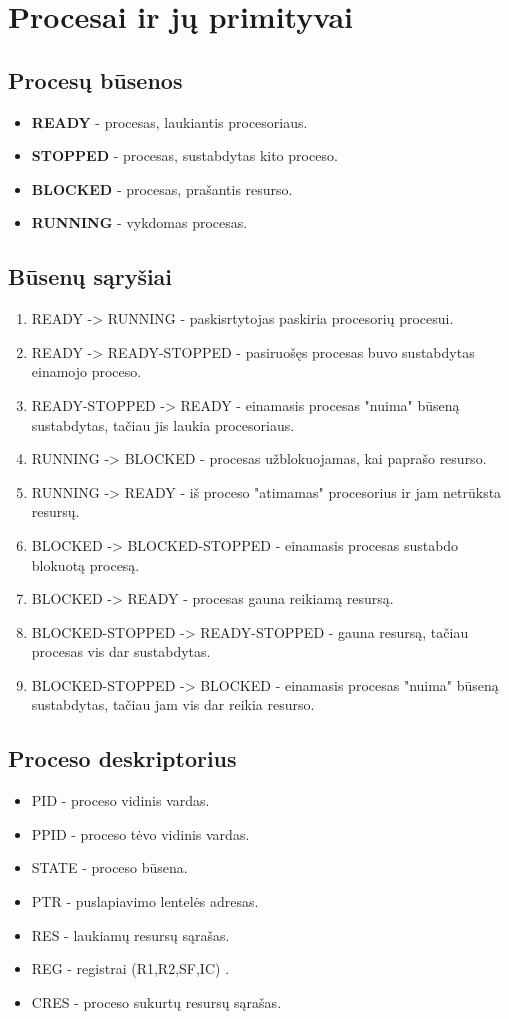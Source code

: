 \section{Procesai ir jų primityvai}
	\subsection{Procesų būsenos}
		\begin{itemize}
			\item \textbf{READY} - procesas, laukiantis procesoriaus.
			\item \textbf{STOPPED} - procesas, sustabdytas kito proceso. 
			\item \textbf{BLOCKED} - procesas, prašantis resurso.
			\item \textbf{RUNNING} - vykdomas procesas.
		\end{itemize}
	\subsection{Būsenų sąryšiai}
		\begin{enumerate}
			\item READY -> RUNNING - paskisrtytojas paskiria procesorių procesui.
			\item READY ->  READY-STOPPED - pasiruošęs procesas buvo sustabdytas einamojo proceso.
			\item READY-STOPPED -> READY - einamasis procesas "nuima" būseną sustabdytas, tačiau jis laukia procesoriaus.
			\item RUNNING -> BLOCKED - procesas užblokuojamas, kai paprašo resurso.
			\item RUNNING -> READY - iš proceso "atimamas" procesorius ir jam netrūksta resursų.
			\item BLOCKED -> BLOCKED-STOPPED - einamasis procesas sustabdo blokuotą procesą.
			\item BLOCKED -> READY - procesas gauna reikiamą resursą.
			\item BLOCKED-STOPPED -> READY-STOPPED - gauna resursą, tačiau procesas vis dar sustabdytas.
			\item BLOCKED-STOPPED -> BLOCKED - einamasis procesas "nuima" būseną sustabdytas, tačiau jam vis dar reikia resurso.
		\end{enumerate}
	\subsection{Proceso deskriptorius}
		\begin{itemize}
			\item PID - proceso vidinis vardas.
			\item PPID - proceso tėvo vidinis vardas.
			\item STATE - proceso būsena.
			\item PTR - puslapiavimo lentelės adresas.
			\item RES - laukiamų resursų sąrašas.
			\item REG - registrai (R1,R2,SF,IC) .
			\item CRES - proceso sukurtų resursų sąrašas.
		\end{itemize}
